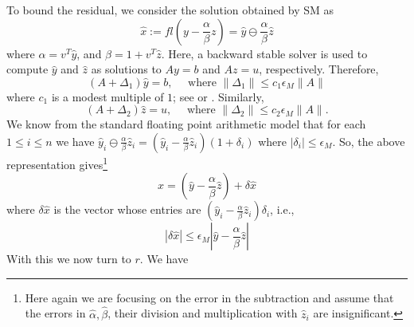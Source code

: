 \documentclass{siamltex}
\newcommand{\eps}{\epsilon}
\begin{document}
To bound the residual, we consider the solution obtained by SM as
\begin{equation}
\label{SM_sol_rep_new:eq}
\hat x := fl(y - \frac{\alpha}{\beta} z) = \hat y \ominus \frac{\alpha}{\beta} \hat z
\end{equation}
where $\alpha = v^T \hat y$, and $\beta = 1+v^T \hat z$. Here, a backward stable solver is used to compute $\hat y$ and $\hat z$ as solutions to $Ay = b$ and $Az=u$, respectively. Therefore, 
\begin{equation}
\label{berr_y:eq}
(A+\Delta_1) \hat y = b, \quad \mbox{ where } \| \Delta_1\| \leq c_1 \eps_M \| A\|
\end{equation}
where $c_1$ is a modest multiple of $1$; see \cite[p. 171]{Watkins} or \cite[Thm. 16.2 ]{TB:2022}. Similarly,
\begin{equation}
\label{berr_z:eq}
(A+\Delta_2) \hat z = u, \quad \mbox{ where } \| \Delta_2\| \leq c_2 \eps_M \| A\|.
\end{equation}
We know from the standard floating point arithmetic model that for each $1\leq i\leq n$ we have $\hat y_i \ominus \frac{\alpha}{\beta} \hat z_i = (\hat y_i - \frac{\alpha}{\beta} \hat z_i) (1+\delta_i)$ where $|\delta_i| \leq \eps_M$. So, the above representation gives\footnote{Here again we are  focusing on the error in the subtraction and assume that the errors in $\hat \alpha, \hat \beta$, their division and multiplication with $\hat z_i$ are insignificant.}
\begin{equation}
\label{SM_sol_rep_new2:eq}
\hat x = (\hat y - \frac{\alpha}{\beta}\hat z) + \delta \hat x
\end{equation}
where $\delta \hat x$ is the vector whose entries are $(\hat y_i - \frac{\alpha}{\beta} \hat z_i)  \delta_i$, i.e.,
\begin{equation}
\label{cancelation_err1:eq}
|\delta \hat x| \leq \eps_M |\hat y - \frac{\alpha}{\beta}\hat z|
\end{equation}
With this we now turn to $r$. We have
\end{document}
